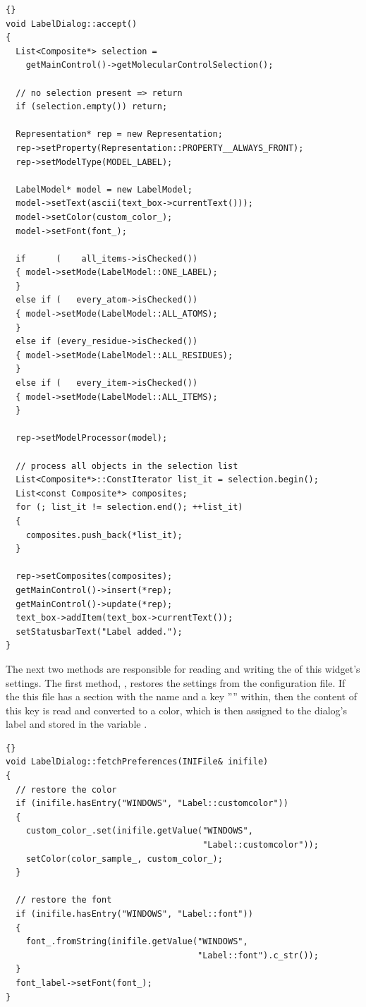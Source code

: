\begin{lstlisting}{}
void LabelDialog::accept()
{
  List<Composite*> selection = 
    getMainControl()->getMolecularControlSelection();

  // no selection present => return
  if (selection.empty()) return;

  Representation* rep = new Representation;
  rep->setProperty(Representation::PROPERTY__ALWAYS_FRONT);
  rep->setModelType(MODEL_LABEL);

  LabelModel* model = new LabelModel;
  model->setText(ascii(text_box->currentText()));
  model->setColor(custom_color_);
  model->setFont(font_);

  if      (    all_items->isChecked())
  { model->setMode(LabelModel::ONE_LABEL);
  }
  else if (   every_atom->isChecked())
  { model->setMode(LabelModel::ALL_ATOMS);
  }
  else if (every_residue->isChecked())
  { model->setMode(LabelModel::ALL_RESIDUES);
  }
  else if (   every_item->isChecked())
  { model->setMode(LabelModel::ALL_ITEMS);
  }

  rep->setModelProcessor(model);

  // process all objects in the selection list
  List<Composite*>::ConstIterator list_it = selection.begin();
  List<const Composite*> composites;
  for (; list_it != selection.end(); ++list_it)
  {
    composites.push_back(*list_it);
  }

  rep->setComposites(composites);
  getMainControl()->insert(*rep);
  getMainControl()->update(*rep);
  text_box->addItem(text_box->currentText());
  setStatusbarText("Label added.");
}
\end{lstlisting}

The next two methods are responsible for reading and writing the of this 
widget's settings. The first method, , restores the 
settings from the configuration file. If the this file has a section with the 
name  and a key '''' within, then the 
content of this key is read and converted to a color, which is then assigned 
to the dialog's label and stored in the variable .

\begin{lstlisting}{}
void LabelDialog::fetchPreferences(INIFile& inifile)
{
  // restore the color 
  if (inifile.hasEntry("WINDOWS", "Label::customcolor"))
  {
    custom_color_.set(inifile.getValue("WINDOWS",
                                       "Label::customcolor"));
    setColor(color_sample_, custom_color_);
  }

  // restore the font
  if (inifile.hasEntry("WINDOWS", "Label::font"))
  {
    font_.fromString(inifile.getValue("WINDOWS",
                                      "Label::font").c_str());
  }
  font_label->setFont(font_);
}
\end{lstlisting}

